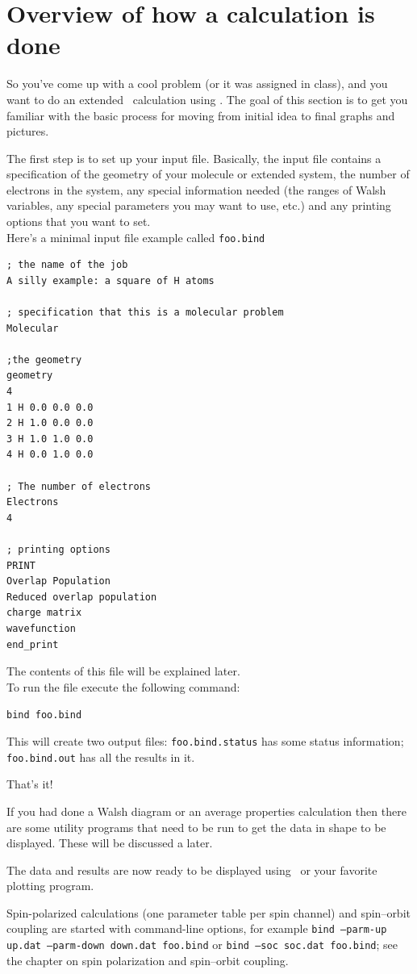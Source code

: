 \chapter{Overview of how a calculation is done}

So you've come up with a cool problem (or it was assigned in class),
and you want to do an extended \huek\ calculation using \prog.  The
goal of this section is to get you familiar with the basic process for
moving from initial idea to final graphs and pictures.

The first step is to set up your input file. 
Basically, the input file contains a specification of the 
geometry of your molecule or extended system,
 the number of electrons in the system, any special information needed 
(the ranges of Walsh variables, any special parameters you may want to use,
 etc.) and any printing options that you want to set. \\[0.1in]



\noindent Here's a minimal input file example called {\tt foo.bind}


\shrinkspacing
\begin{verbatim}
; the name of the job
A silly example: a square of H atoms

; specification that this is a molecular problem
Molecular

;the geometry
geometry
4
1 H 0.0 0.0 0.0
2 H 1.0 0.0 0.0
3 H 1.0 1.0 0.0
4 H 0.0 1.0 0.0

; The number of electrons
Electrons
4

; printing options
PRINT
Overlap Population
Reduced overlap population
charge matrix
wavefunction
end_print
\end{verbatim}
\resumespacing


\noindent The contents of this file will be explained later. \\[0.1in]

\noindent To run the file execute the following command:

{\tt bind foo.bind}

This will create two output files: {\tt foo.bind.status} has some
status information; {\tt foo.bind.out} has all the results in it.

That's it!

If you had done a Walsh diagram or an average properties calculation
then there are some utility programs that need to be run to get the
data in shape to be displayed.  These will be discussed a later.

The data and results are now ready to be displayed using \viewprog\ or
your favorite plotting program.

Spin-polarized calculations (one parameter table per spin channel) and
spin--orbit coupling are started with command-line options, for example
{\tt bind --parm-up up.dat --parm-down down.dat foo.bind} or
{\tt bind --soc soc.dat foo.bind}; see the chapter on spin polarization
and spin--orbit coupling.
